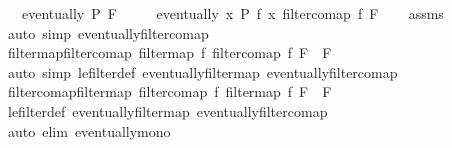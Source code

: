 \begin{isabellebody}
\ \ \ {\isachardoublequoteopen}eventually\ P\ F{\isachardoublequoteclose}\isanewline
\ \ \ \ \ {\isachardoublequoteopen}eventually\ {\isacharparenleft}{\kern0pt}{\isasymlambda}x{\isachardot}{\kern0pt}\ P\ {\isacharparenleft}{\kern0pt}f\ x{\isacharparenright}{\kern0pt}{\isacharparenright}{\kern0pt}\ {\isacharparenleft}{\kern0pt}filtercomap\ f\ F{\isacharparenright}{\kern0pt}{\isachardoublequoteclose}\isanewline
%
\isadelimproof
\ \ %
\endisadelimproof
%
\isatagproof
{}\isamarkupfalse%
\ assms\ \isamarkupfalse%
\ {\isacharparenleft}{\kern0pt}auto\ simp{\isacharcolon}{\kern0pt}\ eventually{\isacharunderscore}{\kern0pt}filtercomap{\isacharparenright}{\kern0pt}%
\endisatagproof
{\isafoldproof}%
%
\isadelimproof
\isanewline
%
\endisadelimproof
\isanewline
{}\isamarkupfalse%
\ filtermap{\isacharunderscore}{\kern0pt}filtercomap{\isacharcolon}{\kern0pt}\ {\isachardoublequoteopen}filtermap\ f\ {\isacharparenleft}{\kern0pt}filtercomap\ f\ F{\isacharparenright}{\kern0pt}\ {\isasymle}\ F{\isachardoublequoteclose}\isanewline
%
\isadelimproof
\ \ %
\endisadelimproof
%
\isatagproof
{}\isamarkupfalse%
\ {\isacharparenleft}{\kern0pt}auto\ simp{\isacharcolon}{\kern0pt}\ le{\isacharunderscore}{\kern0pt}filter{\isacharunderscore}{\kern0pt}def\ eventually{\isacharunderscore}{\kern0pt}filtermap\ eventually{\isacharunderscore}{\kern0pt}filtercomap{\isacharparenright}{\kern0pt}%
\endisatagproof
{\isafoldproof}%
%
\isadelimproof
\isanewline
%
\endisadelimproof
\isanewline
{}\isamarkupfalse%
\ filtercomap{\isacharunderscore}{\kern0pt}filtermap{\isacharcolon}{\kern0pt}\ {\isachardoublequoteopen}filtercomap\ f\ {\isacharparenleft}{\kern0pt}filtermap\ f\ F{\isacharparenright}{\kern0pt}\ {\isasymge}\ F{\isachardoublequoteclose}\isanewline
%
\isadelimproof
\ \ %
\endisadelimproof
%
\isatagproof
{}\isamarkupfalse%
\ le{\isacharunderscore}{\kern0pt}filter{\isacharunderscore}{\kern0pt}def\ eventually{\isacharunderscore}{\kern0pt}filtermap\ eventually{\isacharunderscore}{\kern0pt}filtercomap\isanewline
\ \ \isamarkupfalse%
\ {\isacharparenleft}{\kern0pt}auto\ elim{\isacharbang}{\kern0pt}{\isacharcolon}{\kern0pt}\ eventually{\isacharunderscore}{\kern0pt}mono{\isacharparenright}{\kern0pt}%
\endisatagproof
{\isafoldproof}%
%
\isadelimproof
%
\endisadelimproof
%
\isadelimdocument
%
\endisadelimdocument
%
\isatagdocument
%
\isamarkuptrue%
%
\endisatagdocument
{\isafolddocument}%
%
\isadelimdocument
%
\endisadelimdocument

\end{isabellebody}
